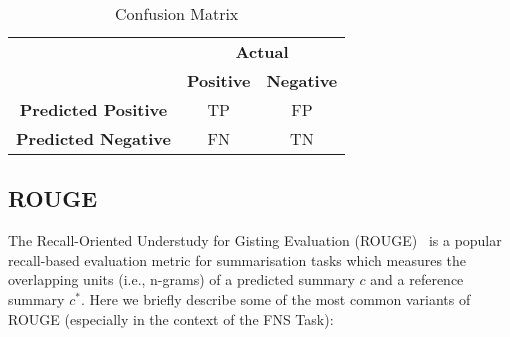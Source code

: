 \begin{table}[ht]
    \centering
    \begin{tabular}{c c c}
        \toprule
        \multirow{2}{*}{} & \multicolumn{2}{c}{\textbf{Actual}} \\
        \cmidrule(lr){2-3}
        & \textbf{Positive} & \textbf{Negative} \\
        \midrule
        \textbf{Predicted Positive} & TP & FP \\
        \textbf{Predicted Negative} & FN & TN \\
        \bottomrule
    \end{tabular}
    \caption{Confusion Matrix}
    \label{tab:confusion_matrix}
\end{table}

\subsection{ROUGE}\label{subsec:rouge}
The Recall-Oriented Understudy for Gisting Evaluation (ROUGE)~\cite{lin2004rouge} is a popular recall-based evaluation metric for
summarisation tasks which measures the overlapping units (i.e., n-grams) of a predicted summary $c$ and a reference summary $c^{*}$.
Here we briefly describe some of the most common variants of ROUGE (especially in the context of the FNS Task):
